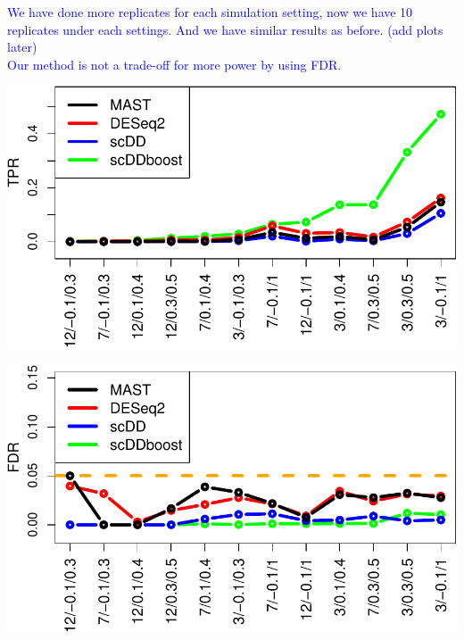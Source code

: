 \documentclass[]{article}
\begin{document}
\textcolor{blue}{We have done more replicates for each simulation setting, now we have 10 replicates under each settings. And we have similar results as before. (add plots later)\\
Our method is not a trade-off for more power by using FDR.}

\includegraphics{Revision_files/figure-latex/unnamed-chunk-3-1.pdf}

\includegraphics{Revision_files/figure-latex/unnamed-chunk-4-1.pdf}
\end{document}
